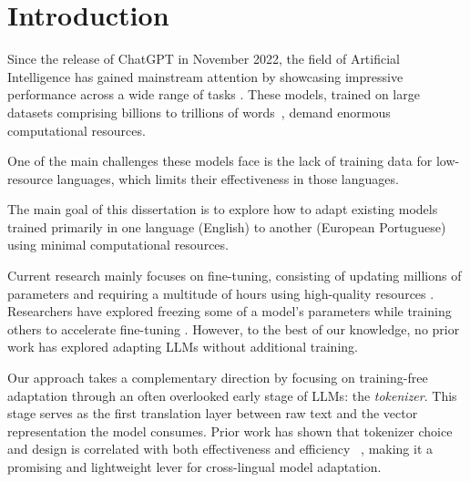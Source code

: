 
\chapter{Introduction}


\label{Section1}

Since the release of ChatGPT\cite{openaiChatGPT} in November 2022, the field of Artificial Intelligence has gained mainstream attention \cite{leiter2024chatgpt} by showcasing impressive performance across a wide range of tasks \cite{haque2022ithinkdisruptivetechnology}.
These models, trained on large datasets comprising billions to trillions of words~\cite{brown2020language, touvron2023llama}, demand enormous computational resources.

One of the main challenges these models face is the lack of training data \cite{sousa2025enhancing,sousa2025tradutor} for low-resource languages, which limits their effectiveness in those languages.

The main goal of this dissertation is to explore how to adapt existing models trained primarily in one language (English) to another (European Portuguese) using minimal computational resources.

Current research mainly focuses on fine-tuning, consisting of updating millions of parameters and requiring a multitude of hours using high-quality resources \cite{xia2024understanding}. Researchers have explored freezing some of a model's parameters while training others to accelerate fine-tuning \cite{hu2022lora}. However, to the best of our knowledge, no prior work has explored adapting LLMs without additional training.

Our approach takes a complementary direction by focusing on training-free adaptation through an often overlooked early stage of LLMs: the \textit{tokenizer}. This stage serves as the first translation layer between raw text and the vector representation the model consumes. Prior work has shown that tokenizer choice and design is correlated with both effectiveness and efficiency ~\cite{bostrom2020byte, lotz2025beyond}, making it a promising and lightweight lever for cross-lingual model adaptation.

